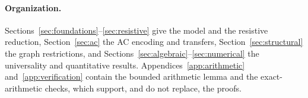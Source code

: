 \paragraph{Organization.}
Sections~\ref{sec:foundations}--\ref{sec:resistive} give the model and the
resistive reduction, Section~\ref{sec:ac} the AC encoding and transfers,
Section~\ref{sec:structural} the graph restrictions, and
Sections~\ref{sec:algebraic}--\ref{sec:numerical} the universality and
quantitative results. Appendices~\ref{app:arithmetic}
and~\ref{app:verification} contain the bounded arithmetic lemma and the
exact-arithmetic checks, which support, and do not replace, the proofs.
